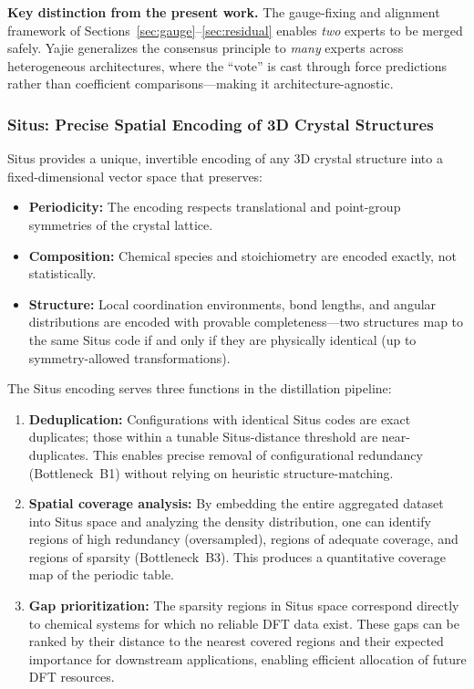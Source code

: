 \documentclass[twoside,prb,aps,floatfix,superscriptaddress,longbibliography]{revtex4-2}
\begin{document}
\textbf{Key distinction from the present work.} The gauge-fixing and alignment framework of Sections~\ref{sec:gauge}--\ref{sec:residual} enables \emph{two} experts to be merged safely. Yajie generalizes the consensus principle to \emph{many} experts across heterogeneous architectures, where the ``vote'' is cast through force predictions rather than coefficient comparisons---making it architecture-agnostic.

\subsubsection{Situs: Precise Spatial Encoding of 3D Crystal Structures}

Situs provides a unique, invertible encoding of any 3D crystal structure into a fixed-dimensional vector space that preserves:
\begin{itemize}
    \item \textbf{Periodicity:} The encoding respects translational and point-group symmetries of the crystal lattice.
    \item \textbf{Composition:} Chemical species and stoichiometry are encoded exactly, not statistically.
    \item \textbf{Structure:} Local coordination environments, bond lengths, and angular distributions are encoded with provable completeness---two structures map to the same Situs code if and only if they are physically identical (up to symmetry-allowed transformations).
\end{itemize}

The Situs encoding serves three functions in the distillation pipeline:
\begin{enumerate}[label=(\roman*)]
    \item \textbf{Deduplication:} Configurations with identical Situs codes are exact duplicates; those within a tunable Situs-distance threshold are near-duplicates. This enables precise removal of configurational redundancy (Bottleneck~B1) without relying on heuristic structure-matching.
    \item \textbf{Spatial coverage analysis:} By embedding the entire aggregated dataset into Situs space and analyzing the density distribution, one can identify regions of high redundancy (oversampled), regions of adequate coverage, and regions of sparsity (Bottleneck~B3). This produces a quantitative coverage map of the periodic table.
    \item \textbf{Gap prioritization:} The sparsity regions in Situs space correspond directly to chemical systems for which no reliable DFT data exist. These gaps can be ranked by their distance to the nearest covered regions and their expected importance for downstream applications, enabling efficient allocation of future DFT resources.
\end{enumerate}
\end{document}
